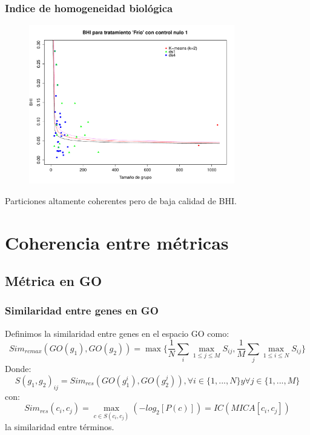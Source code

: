 \documentclass[serif,9pt, t]{beamer}
\begin{document}
\begin{frame}\frametitle{Indice de homogeneidad biológica} 
\begin{figure}
    	\centering
	\includegraphics[width=0.8\textwidth]{bhi_km_ds1_ds4_control1.pdf}
\end{figure}
\centering
Particiones altamente coherentes pero de baja calidad de BHI.
\end{frame}

\section{Coherencia entre métricas}

\subsection{Métrica en GO}
\begin{frame}\frametitle{Similaridad entre genes en GO}
Definimos la similaridad entre genes en el espacio GO como:
\begin{equation}
	Sim_{rcmax}(GO(g_1), GO(g_2)) = \max\{\frac{1}{N}\sum\limits_{i}\max\limits_{1\leq j \leq M}S_{ij}, \frac{1}{M}\sum\limits_{j}\max\limits_{1\leq i \leq N}S_{ij}\}
\end{equation}
\bigskip
Donde:
\begin{equation}
	S(g_1, g_2)_{ij} = Sim_{res}(GO(g_1^i), GO(g_2^j)), \forall i \in \{1,...,N\} y \forall j \in \{1,...,M\}
\end{equation}
con:
\begin{equation}
	Sim_{res}(c_i, c_j) = \max\limits_{c \in S(c_i, c_j)}(-log_2[P(c)]) = IC(MICA[c_i, c_j])
\end{equation}
la similaridad entre términos.
\end{frame}
\end{document}
